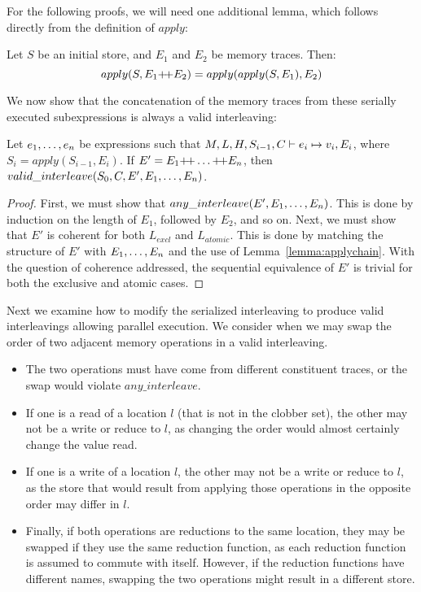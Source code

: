 For the following proofs, we will need one additional lemma, which follows directly
from the definition of $apply$:

\begin{lem}
\label{lemma:applychain}
\rm
Let $S$ be an initial store, and $E_1$ and $E_2$ be memory traces.  Then:
$$apply(S, E_1 \text{+\!+} E_2) = apply(apply(S, E_1), E_2)$$
\end{lem}

We now show that the concatenation of the memory traces from these serially
executed subexpressions is always a valid interleaving:

\begin{thm}
\label{thm:sequentialfull}
\rm
Let ${e}_1,\ldots,{e}_n$ be expressions such that 
$M, L, H, S_{i-1},\linebreak C \vdash e_i \mapsto v_i, E_i$,
where $S_i = apply(S_{i-1}, E_i)$.  If $E' = E_1 \text{+\!+} \ldots \text{+\!+} E_n$, then
$valid\_interleave(S_0, C, E', {E}_1,\ldots,{E}_n)$.
\end{thm}

\begin{proof}
First, we must show that $any\_interleave(E', {E}_1,\ldots,{E}_n)$.  This is done by
induction on the length of $E_1$, followed by $E_2$, and so on.  Next, we must
show that $E'$ is coherent for both $L_{excl}$ and $L_{atomic}$.  This is done by
matching the structure of $E'$ with ${E}_1,\ldots,{E}_n$ and the use of Lemma~\ref{lemma:applychain}.
With the
question of coherence addressed, the sequential equivalence of $E'$ is trivial
for both the exclusive and atomic cases.
\end{proof}

Next we examine how to modify the serialized interleaving to produce valid interleavings allowing parallel execution. 
We consider when we may swap the order of two adjacent memory operations in a valid interleaving.
\begin{itemize}
\item The two operations must have come from different constituent
traces, or the swap would violate $any\_interleave$.
\item If one is a read of
a location $l$ (that is not in the clobber set), the other may not be a write or reduce to $l$, 
as changing the order would almost certainly change the value read.
\item If one is a write of a location $l$, the other may not be a write or reduce to $l$,
as the store that would result from applying those operations in the opposite order may
differ in $l$.
\item Finally, if both operations are reductions to the same location, they may be swapped if they
use the same reduction function, as each reduction function is assumed to commute with itself.  
However, if the reduction functions have different names, swapping the two operations might result in a different store.
\end{itemize}


